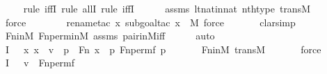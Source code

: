 \begin{isabellebody}
\ \ \ \ \isamarkupfalse%
{\isacharparenleft}{\kern0pt}rule\ iffI{\isacharcomma}{\kern0pt}\ rule\ allI{\isacharcomma}{\kern0pt}\ rule\ iffI{\isacharparenright}{\kern0pt}\isanewline
\ \ \ \ \isamarkupfalse%
\ assms\ lt{\isacharunderscore}{\kern0pt}nat{\isacharunderscore}{\kern0pt}in{\isacharunderscore}{\kern0pt}nat\ nth{\isacharunderscore}{\kern0pt}type\ transM\isanewline
\ \ \ \ \ \ \isamarkupfalse%
\ force\ \isanewline
\ \ \ \ \ \isamarkupfalse%
\ {\isacharparenleft}{\kern0pt}rename{\isacharunderscore}{\kern0pt}tac\ x{\isacharcomma}{\kern0pt}\ subgoal{\isacharunderscore}{\kern0pt}tac\ {\isachardoublequoteopen}x\ {\isasymin}\ M{\isachardoublequoteclose}{\isacharcomma}{\kern0pt}\ force{\isacharparenright}{\kern0pt}\isanewline
\ \ \ \ \ \isamarkupfalse%
\ clarsimp\isanewline
\ \ \ \ \isamarkupfalse%
\ Fn{\isacharunderscore}{\kern0pt}in{\isacharunderscore}{\kern0pt}M\ Fn{\isacharunderscore}{\kern0pt}perm{\isacharunderscore}{\kern0pt}in{\isacharunderscore}{\kern0pt}M\ assms\ pair{\isacharunderscore}{\kern0pt}in{\isacharunderscore}{\kern0pt}M{\isacharunderscore}{\kern0pt}iff\isanewline
\ \ \ \ \isamarkupfalse%
\ auto\isanewline
\ \ \isamarkupfalse%
\ I{}{\isacharcolon}{\kern0pt}\ {\isachardoublequoteopen}{\isachardot}{\kern0pt}{\isachardot}{\kern0pt}{\isachardot}{\kern0pt}\ {\isasymlongleftrightarrow}\ {\isacharparenleft}{\kern0pt}{\isasymforall}x{\isachardot}{\kern0pt}\ x\ {\isasymin}\ v\ {\isasymlongleftrightarrow}\ {\isacharparenleft}{\kern0pt}{\isasymexists}p\ {\isasymin}\ Fn{\isachardot}{\kern0pt}\ x\ {\isacharequal}{\kern0pt}\ {\isacharless}{\kern0pt}p{\isacharcomma}{\kern0pt}\ Fn{\isacharunderscore}{\kern0pt}perm{\isacharparenleft}{\kern0pt}f{\isacharcomma}{\kern0pt}\ p{\isacharparenright}{\kern0pt}{\isachargreater}{\kern0pt}{\isacharparenright}{\kern0pt}{\isacharparenright}{\kern0pt}{\isachardoublequoteclose}\ \isanewline
\ \ \ \ \isamarkupfalse%
\ Fn{\isacharunderscore}{\kern0pt}in{\isacharunderscore}{\kern0pt}M\ transM\ \isanewline
\ \ \ \ \isamarkupfalse%
\ force\ \isanewline
\ \ \isamarkupfalse%
\ I{}{\isacharcolon}{\kern0pt}\ {\isachardoublequoteopen}{\isachardot}{\kern0pt}{\isachardot}{\kern0pt}{\isachardot}{\kern0pt}\ {\isasymlongleftrightarrow}\ v\ {\isacharequal}{\kern0pt}\ Fn{\isacharunderscore}{\kern0pt}perm{\isacharprime}{\kern0pt}{\isacharparenleft}{\kern0pt}f{\isacharparenright}{\kern0pt}{\isachardoublequoteclose}\ \isanewline
\ \ \ \ \isamarkupfalse%

\end{isabellebody}
